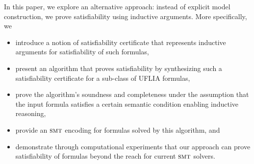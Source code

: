 \documentclass[runningheads]{llncs}
\newcommand{\smt}{\textsc{smt}}
\begin{document}
In this paper, we explore an alternative approach: instead of explicit model construction, we prove satisfiability using inductive arguments. More specifically, we
\begin{itemize}
\item introduce a notion of satisfiability certificate that represents inductive arguments for satisfiability of such formulas,
\item present an algorithm that proves satisfiability by synthesizing such a satisfiability certificate for a sub-class of UFLIA formulas,
\item prove the algorithm's soundness and completeness under the assumption that the input formula satisfies a certain semantic condition enabling inductive reasoning,
\item provide an $\smt$ encoding for formulas solved by this algorithm, and 
\item demonstrate through computational experiments that our approach can prove satisfiability of formulas beyond the reach for current $\smt$ solvers.
\end{itemize}


\end{document}
